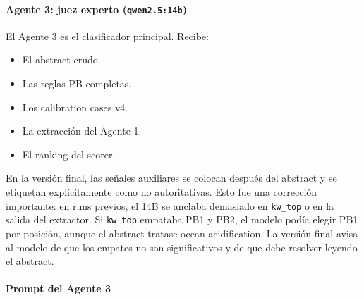 \paragraph*{Agente 3: juez experto (\texttt{qwen2.5:14b})}

El Agente 3 es el clasificador principal. Recibe:

\begin{itemize}
\item El abstract crudo.
\item Las reglas PB completas.
\item Los calibration cases v4.
\item La extracción del Agente 1.
\item El ranking del scorer.
\end{itemize}

En la versión final, las señales auxiliares se colocan después del abstract y se etiquetan explícitamente como no autoritativas. Esto fue una corrección importante: en runs previos, el 14B se anclaba demasiado en \texttt{kw\_top} o en la salida del extractor. Si \texttt{kw\_top} empataba PB1 y PB2, el modelo podía elegir PB1 por posición, aunque el abstract tratase ocean acidification. La versión final avisa al modelo de que los empates no son significativos y de que debe resolver leyendo el abstract.

\paragraph*{Prompt del Agente 3}

